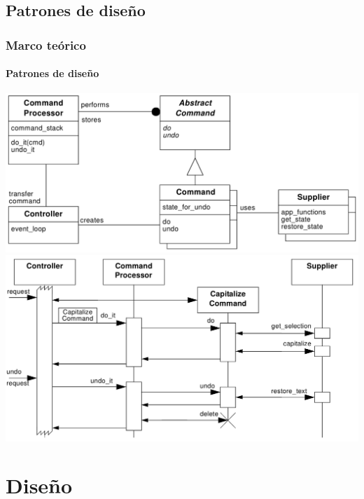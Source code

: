 \documentclass[xcolor=dvipsnames]{beamer}
\begin{document}
    \subsection{Patrones de diseño}
    \begin{frame}
        \frametitle{Marco teórico}
        \framesubtitle{Patrones de diseño}
        
        \centering
        \includegraphics[height=0.4\textheight]{img/command_processor_class.png}
        \vspace{0.5cm}
        \includegraphics[height=0.5\textheight]{img/command_processor_colab.png}
        
    \end{frame}
    
    \section{Diseño}
\end{document}
